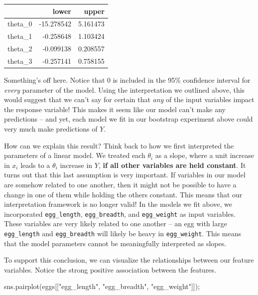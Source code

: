 \documentclass[
  letterpaper,
  DIV=11,
  numbers=noendperiod]{scrreprt}
\newenvironment{Shaded}{\begin{snugshade}}{\end{snugshade}}
\newcommand{\NormalTok}[1]{\textcolor[rgb]{0.00,0.23,0.31}{#1}}
\newcommand{\OperatorTok}[1]{\textcolor[rgb]{0.37,0.37,0.37}{#1}}
\newcommand{\StringTok}[1]{\textcolor[rgb]{0.13,0.47,0.30}{#1}}
\begin{document}
\begin{tabular}{lrr}
\toprule
{} &      lower &     upper \\
\midrule
theta\_0 & -15.278542 &  5.161473 \\
theta\_1 &  -0.258648 &  1.103424 \\
theta\_2 &  -0.099138 &  0.208557 \\
theta\_3 &  -0.257141 &  0.758155 \\
\bottomrule
\end{tabular}

Something's off here. Notice that 0 is included in the 95\% confidence
interval for \emph{every} parameter of the model. Using the
interpretation we outlined above, this would suggest that we can't say
for certain that \emph{any} of the input variables impact the response
variable! This makes it seem like our model can't make any predictions
-- and yet, each model we fit in our bootstrap experiment above could
very much make predictions of \(Y\).

How can we explain this result? Think back to how we first interpreted
the parameters of a linear model. We treated each \(\theta_i\) as a
slope, where a unit increase in \(x_i\) leads to a \(\theta_i\) increase
in \(Y\), \textbf{if all other variables are held constant}. It turns
out that this last assumption is very important. If variables in our
model are somehow related to one another, then it might not be possible
to have a change in one of them while holding the others constant. This
means that our interpretation framework is no longer valid! In the
models we fit above, we incorporated \texttt{egg\_length},
\texttt{egg\_breadth}, and \texttt{egg\_weight} as input variables.
These variables are very likely related to one another -- an egg with
large \texttt{egg\_length} and \texttt{egg\_breadth} will likely be
heavy in \texttt{egg\_weight}. This means that the model parameters
cannot be meaningfully interpreted as slopes.

To support this conclusion, we can visualize the relationships between
our feature variables. Notice the strong positive association between
the features.

\begin{Shaded}
\begin{Highlighting}[]
\NormalTok{sns.pairplot(eggs[[}\StringTok{"egg\_length"}\NormalTok{, }\StringTok{"egg\_breadth"}\NormalTok{, }\StringTok{"egg\_weight"}\NormalTok{]])}\OperatorTok{;}
\end{Highlighting}
\end{Shaded}
\end{document}
